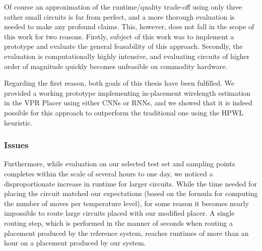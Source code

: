 Of course an approximation of the runtime/quality trade-off using only three rather small circuits is far from perfect, and a more thorough evaluation is needed to make any profound claims. This, however, does not fall in the scope of this work for two reasons. Firstly, subject of this work was to implement a prototype and evaluate the general feasability of this approach. Secondly, the evaluation is computationally highly intensive, and evaluating circuits of higher order of magnitude quickly becomes unfeasible on commodity hardware.

Regarding the first reason, both goals of this thesis have been fulfilled. We provided a working prototype implementing in-placement wirelength estimation in the \gls{VPR} Placer using either \glspl{CNN} or \glspl{RNN}, and we showed that it is indeed possible for this approach to outperform the traditional one using the \gls{HPWL} heuristic.

\subsubsection{Issues}

Furthermore, while evaluation on our selected test set and sampling points completes within the scale of several hours to one day, we noticed a disproportionate increase in runtime for larger circuits. While the time needed for placing the circuit matched our expectations (based on the formula for computing the number of moves per temperature level), for some reason it becomes nearly impossible to route large circuits placed with our modified placer. A single routing step, which is performed in the manner of seconds when routing a placement produced by the reference system, reaches runtimes of more than an hour on a placement produced by our system. 

